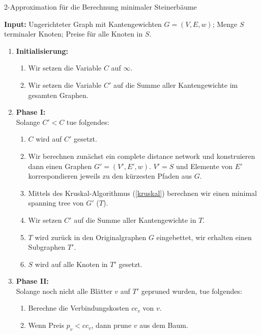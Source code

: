 \documentclass[a4paper,10pt]{article}
\begin{document}
\begin{algorithm}
  \label{mst}
  \caption{2-Approximation für die Berechnung minimaler Steinerbäume}
      \textbf{Input: } Ungerichteter Graph mit Kantengewichten $G = (V,E, w)$; Menge $S$ terminaler Knoten; Preise für alle Knoten in $S$.
      
\begin{enumerate}
\item\textbf{Initialisierung:}

\begin{enumerate}
\item Wir setzen die Variable $C$ auf $\infty$.
\item Wir setzen die Variable $C'$ auf die Summe aller Kantengewichte im gesamten Graphen.
\end{enumerate}

\item\textbf{Phase I:}\\
Solange $C' < C$ tue folgendes:

\begin{enumerate}
\item $C$ wird auf $C'$ gesetzt.
\item Wir berechnen zunächst ein complete distance network und konstruieren dann einen Graphen $G' = (V', E', w)$. $V' = S$ und Elemente von $E'$ korrespondieren jeweils zu den kürzesten Pfaden aus $G$.
\item Mittels des Kruskal-Algorithmus (\ref{kruskal}) berechnen wir einen minimal spanning tree von $G'$ ($T$).
\item Wir setzen $C'$ auf die Summe aller Kantengewichte in $T$.
\item $T$ wird zurück in den Originalgraphen $G$ eingebettet, wir erhalten einen Subgraphen $T'$.
\item $S$ wird auf alle Knoten in $T'$ gesetzt.
\end{enumerate}

\item\textbf{Phase II:}\\
Solange noch nicht alle Blätter $v$ auf $T'$ gepruned wurden, tue folgendes:
\begin{enumerate}
\item Berechne die Verbindungskosten $cc_v$ von $v$.
\item Wenn Preis $p_v < cc_v$, dann prune $v$ aus dem Baum.
\end{enumerate} 
\end{enumerate}      
\end{algorithm}
\end{document}
